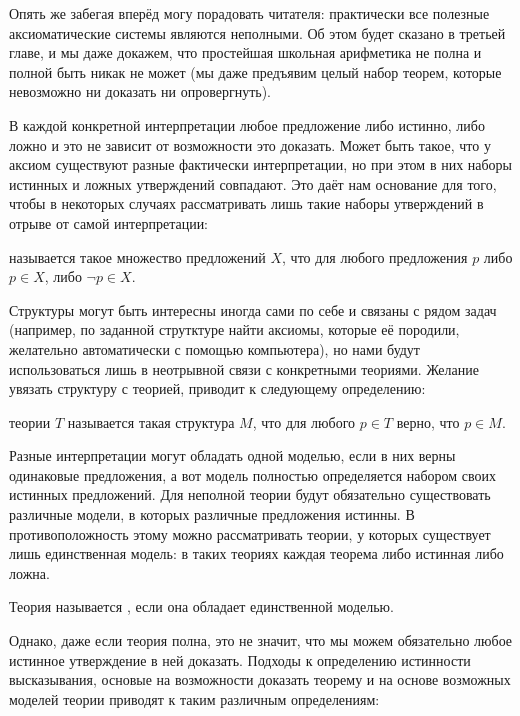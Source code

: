 Опять же забегая вперёд могу порадовать читателя: практически все полезные аксиоматические системы являются неполными. Об этом будет сказано в третьей главе, и мы даже докажем, что простейшая школьная арифметика не полна и полной быть никак не может (мы даже предъявим целый набор теорем, которые невозможно ни доказать ни опровергнуть).

В каждой конкретной интерпретации любое предложение либо истинно, либо ложно и это не зависит от возможности это доказать. Может быть такое, что у аксиом существуют разные фактически интерпретации, но при этом в них наборы истинных и ложных утверждений совпадают. Это даёт нам основание для того, чтобы в некоторых случаях рассматривать лишь такие наборы утверждений в отрыве от самой интерпретации:

\begin{definition}
 называется такое множество предложений $X$, что для любого предложения $p$ либо $p\in X$, либо $\neg p \in X$.
\end{definition}

Структуры могут быть интересны иногда сами по себе и связаны с рядом задач (например, по заданной струтктуре найти аксиомы, которые её породили, желательно автоматически с помощью компьютера), но нами будут использоваться лишь в неотрывной связи с конкретными теориями. Желание увязать структуру с теорией, приводит к следующему определению:

\begin{definition}
 теории $T$ называется такая структура $M$, что для любого $p\in T$ верно, что $p\in M$.
\end{definition}

Разные интерпретации могут обладать одной моделью, если в них верны одинаковые предложения, а вот модель полностью определяется набором своих истинных предложений. Для неполной теории будут обязательно существовать различные модели, в которых различные предложения истинны. В противоположность этому можно рассматривать теории, у которых существует лишь единственная модель: в таких теориях каждая теорема либо истинная либо ложна.

\begin{definition}
Теория называется , если она обладает единственной моделью.
\end{definition}

Однако, даже если теория полна, это не значит, что мы можем обязательно любое истинное утверждение в ней доказать. Подходы к определению истинности высказывания, основые на возможности доказать теорему и на основе возможных моделей теории приводят к таким различным определениям:

